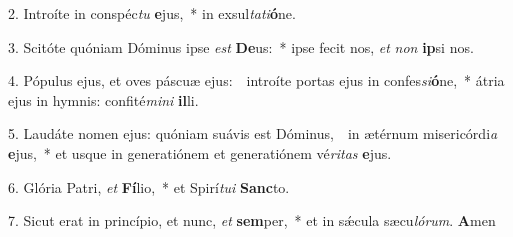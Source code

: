 
2. Introíte in conspéc\textit{tu} \textbf{e}jus,~* in exsul\textit{ta}\textit{ti}\textbf{ó}ne.

3. Scitóte quóniam Dóminus ipse \textit{est} \textbf{De}us:~* ipse fecit nos, \textit{et} \textit{non} \textbf{ip}si nos.

4. Pópulus ejus, et oves páscuæ ejus:~\GreDagger\ introíte portas ejus in confes\textit{si}\textbf{ó}ne,~* átria ejus in hymnis: confité\textit{mi}\textit{ni} \textbf{il}li.

5. Laudáte nomen ejus: quóniam suávis est Dóminus,~\GreDagger\ in ætérnum misericórdi\textit{a} \textbf{e}jus,~* et usque in generatiónem et generatiónem vé\textit{ri}\textit{tas} \textbf{e}jus.

6. Glória Patri, \textit{et} \textbf{Fí}lio,~* et Spirí\textit{tu}\textit{i} \textbf{Sanc}to.

7. Sicut erat in princípio, et nunc, \textit{et} \textbf{sem}per,~* et in s\'{\ae}cula sæcu\textit{ló}\textit{rum}. \textbf{A}men